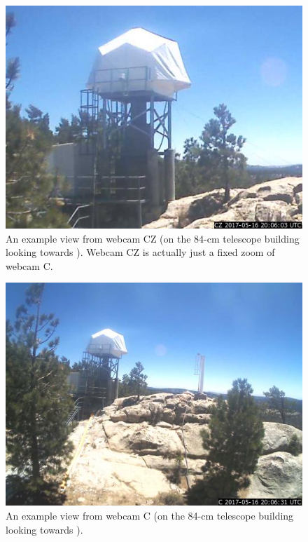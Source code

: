\begin{figure}
\begin{center}
\includegraphics[width=0.8\linewidth]{figures/interface-coatli-webcam-cz.jpg}
\end{center}
\caption{An example view from webcam CZ (on the 84-cm telescope building looking towards {\projectname}). Webcam CZ is actually just a fixed zoom of webcam C.}
\label{figure:interface-webcam-cz}
\end{figure}

\begin{figure}
\begin{center}
\includegraphics[width=0.8\linewidth]{figures/interface-coatli-webcam-c.jpg}
\end{center}
\caption{An example view from webcam C (on the 84-cm telescope building looking towards {\projectname}).}
\label{figure:interface-webcam-c}
\end{figure}

\fi

\ifddoti

